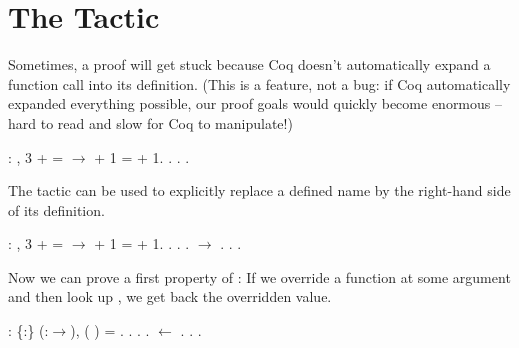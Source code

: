 \documentclass[12pt]{report}
\begin{document}
\section{The \texorpdfstring{\protect{}}{unfold} Tactic}



 Sometimes, a proof will get stuck because Coq doesn't
    automatically expand a function call into its definition.  (This
    is a feature, not a bug: if Coq automatically expanded everything
    possible, our proof goals would quickly become enormous -- hard to
    read and slow for Coq to manipulate!) \begin{coqdoccode}
\coqdocemptyline
\coqdocnoindent
{}  : \coqdockw{\ensuremath{\forall}}  ,\coqdoceol
\coqdocindent{1.00em}
3 +  =  \ensuremath{\rightarrow}\coqdoceol
\coqdocindent{1.00em}
  + 1 =  + 1.\coqdoceol
\coqdocnoindent
{}.\coqdoceol
\coqdocindent{1.00em}
   .\coqdoceol
\coqdocindent{1.00em}
.\coqdoceol
\coqdocemptyline
\end{coqdoccode}
The  tactic can be used to explicitly replace a
    defined name by the right-hand side of its definition.  \begin{coqdoccode}
\coqdocemptyline
\coqdocnoindent
{}  : \coqdockw{\ensuremath{\forall}}  ,\coqdoceol
\coqdocindent{1.00em}
3 +  =  \ensuremath{\rightarrow}\coqdoceol
\coqdocindent{1.00em}
  + 1 =  + 1.\coqdoceol
\coqdocnoindent
{}.\coqdoceol
\coqdocindent{1.00em}
   .\coqdoceol
\coqdocindent{1.00em}
 .\coqdoceol
\coqdocindent{1.00em}
 \ensuremath{\rightarrow} .\coqdoceol
\coqdocindent{1.00em}
. .\coqdoceol
\coqdocemptyline
\end{coqdoccode}
Now we can prove a first property of : If we
    override a function at some argument  and then look up , we
    get back the overridden value. \begin{coqdoccode}
\coqdocemptyline
\coqdocnoindent
{}  : \coqdockw{\ensuremath{\forall}} \{:\}   (:\ensuremath{\rightarrow}),\coqdoceol
\coqdocindent{1.00em}
(   )  = .\coqdoceol
\coqdocnoindent
{}.\coqdoceol
\coqdocindent{1.00em}
    .\coqdoceol
\coqdocindent{1.00em}
 .\coqdoceol
\coqdocindent{1.00em}
 \ensuremath{\leftarrow} .\coqdoceol
\coqdocindent{1.00em}
. .\coqdoceol
\coqdocemptyline
\end{coqdoccode}
\end{document}

